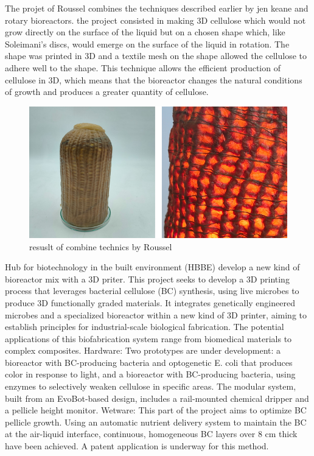 The projet of Roussel combines the techniques described earlier by jen keane and rotary bioreactors. the project consisted in making 3D cellulose which would not grow directly on the surface of the liquid but on a chosen shape which, like Soleimani's discs, would emerge on the surface of the liquid in rotation. 
The shape was printed in 3D and a textile mesh on the shape allowed the cellulose to adhere well to the shape. 
This technique allows the efficient production of cellulose in 3D, which means that the bioreactor changes the natural conditions of growth and produces a greater quantity of cellulose. 

\begin{figure}[h]
    \centering
    \includegraphics{images/machinevivien.png}
    \caption{resuslt of combine technics by Roussel}
    \label{fig:3Droussel}
\end{figure} 

Hub for biotechnology in the built environment (HBBE) develop a new kind of bioreactor mix with a 3D priter. This project seeks to develop a 3D printing process that leverages bacterial cellulose (BC) synthesis, using live microbes to produce 3D functionally graded materials. It integrates genetically engineered microbes and a specialized bioreactor within a new kind of 3D printer, aiming to establish principles for industrial-scale biological fabrication. The potential applications of this biofabrication system range from biomedical materials to complex composites.
Hardware: Two prototypes are under development:  a bioreactor with BC-producing bacteria and optogenetic E. coli that produces color in response to light, and a bioreactor with BC-producing bacteria, using enzymes to selectively weaken cellulose in specific areas. The modular system, built from an EvoBot-based design, includes a rail-mounted chemical dripper and a pellicle height monitor.
Wetware: This part of the project aims to optimize BC pellicle growth. Using an automatic nutrient delivery system to maintain the BC at the air-liquid interface, continuous, homogeneous BC layers over 8 cm thick have been achieved. A patent application is underway for this method.




